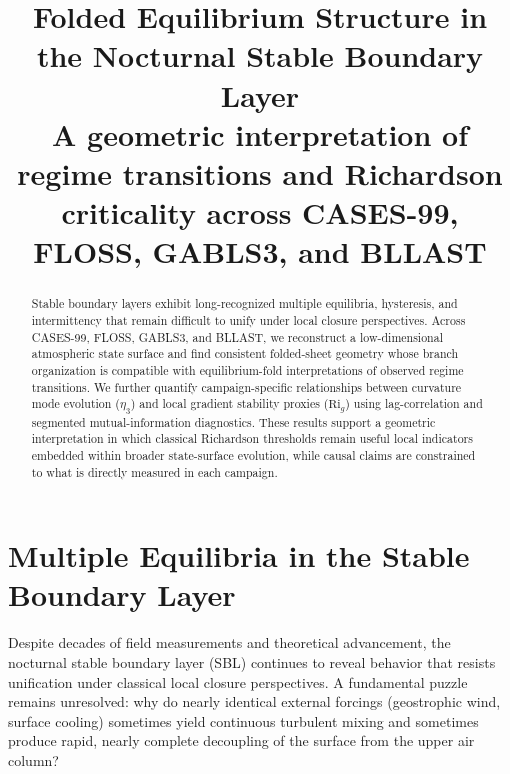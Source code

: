 \documentclass[12pt,a4paper]{article}
\title{Folded Equilibrium Structure in the Nocturnal Stable Boundary Layer\\\large A geometric interpretation of regime transitions and Richardson criticality across CASES-99, FLOSS, GABLS3, and BLLAST}
\author{}
\date{}
\begin{document}
\maketitle

\begin{abstract}
Stable boundary layers exhibit long-recognized multiple equilibria, hysteresis, and intermittency that remain difficult to unify under local closure perspectives. Across CASES-99, FLOSS, GABLS3, and BLLAST, we reconstruct a low-dimensional atmospheric state surface and find consistent folded-sheet geometry whose branch organization is compatible with equilibrium-fold interpretations of observed regime transitions. We further quantify campaign-specific relationships between curvature mode evolution ($\eta_3$) and local gradient stability proxies ($\mathrm{Ri}_g$) using lag-correlation and segmented mutual-information diagnostics. These results support a geometric interpretation in which classical Richardson thresholds remain useful local indicators embedded within broader state-surface evolution, while causal claims are constrained to what is directly measured in each campaign.
\end{abstract}

\section{Multiple Equilibria in the Stable Boundary Layer}

Despite decades of field measurements and theoretical advancement, the nocturnal stable boundary layer (SBL) continues to reveal behavior that resists unification under classical local closure perspectives. A fundamental puzzle remains unresolved: why do nearly identical external forcings (geostrophic wind, surface cooling) sometimes yield continuous turbulent mixing and sometimes produce rapid, nearly complete decoupling of the surface from the upper air column?
\end{document}
